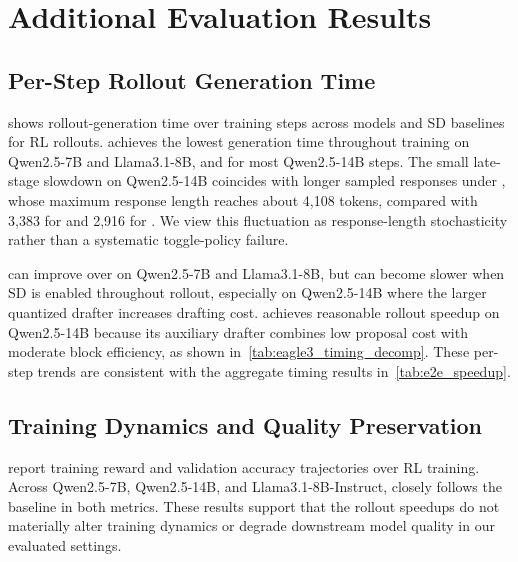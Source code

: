 


\section{Additional Evaluation Results}

\subsection{Per-Step Rollout Generation Time}
\label{app:gen_time_over_time}

 shows rollout-generation time over training steps across models and SD baselines for RL rollouts.
\methodtitle{} achieves the lowest generation time throughout training on Qwen2.5-7B and Llama3.1-8B, and for most Qwen2.5-14B steps.
The small late-stage slowdown on Qwen2.5-14B coincides with longer sampled responses under \methodtitle{}, whose maximum response length reaches about 4,108 tokens, compared with 3,383 for \learned{} and 2,916 for \history{}.
We view this fluctuation as response-length stochasticity rather than a systematic toggle-policy failure.

\Alwayssd{} can improve over \nosd{} on Qwen2.5-7B and Llama3.1-8B, but can become slower when SD is enabled throughout rollout, especially on Qwen2.5-14B where the larger quantized drafter increases drafting cost.
\Learned{} achieves reasonable rollout speedup on Qwen2.5-14B because its auxiliary drafter combines low proposal cost with moderate block efficiency, as shown in~\cref{tab:eagle3_timing_decomp}.
These per-step trends are consistent with the aggregate timing results in~\cref{tab:e2e_speedup}.


\subsection{Training Dynamics and Quality Preservation}
\label{app:quality-preservation}

 report training reward and validation accuracy trajectories over RL training.
Across Qwen2.5-7B, Qwen2.5-14B, and Llama3.1-8B-Instruct, \methodtitle{} closely follows the \nosd{} baseline in both metrics.
These results support that the rollout speedups do not materially alter training dynamics or degrade downstream model quality in our evaluated settings.



